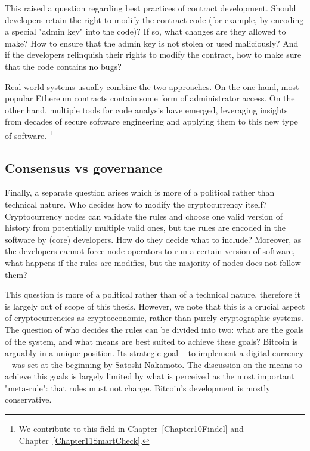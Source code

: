 This raised a question regarding best practices of contract development.
Should developers retain the right to modify the contract code (for example, by encoding a special "admin key" into the code)?
If so, what changes are they allowed to make?
How to ensure that the admin key is not stolen or used maliciously?
And if the developers relinquish their rights to modify the contract, how to make sure that the code contains no bugs?

Real-world systems usually combine the two approaches.
On the one hand, most popular Ethereum contracts contain some form of administrator access.
On the other hand, multiple tools for code analysis have emerged, leveraging insights from decades of secure software engineering and applying them to this new type of software.
\footnote{We contribute to this field in Chapter~\ref{Chapter10Findel} and Chapter~\ref{Chapter11SmartCheck}.}


\subsection{Consensus vs governance}

Finally, a separate question arises which is more of a political rather than technical nature.
Who decides how to modify the cryptocurrency itself?
Cryptocurrency nodes can validate the rules and choose one valid version of history from potentially multiple valid ones, but the rules are encoded in the software by (core) developers.
How do they decide what to include?
Moreover, as the developers cannot force node operators to run a certain version of software, what happens if the rules are modifies, but the majority of nodes does not follow them?

This question is more of a political rather than of a technical nature, therefore it is largely out of scope of this thesis.
However, we note that this is a crucial aspect of cryptocurrencies as cryptoeconomic, rather than purely cryptographic systems.
The question of who decides the rules can be divided into two: what are the goals of the system, and what means are best suited to achieve these goals?
Bitcoin is arguably in a unique position.
Its strategic goal -- to implement a digital currency -- was set at the beginning by Satoshi Nakamoto.
The discussion on the means to achieve this goals is largely limited by what is perceived as the most important "meta-rule": that rules must not change.
Bitcoin's development is mostly conservative.

